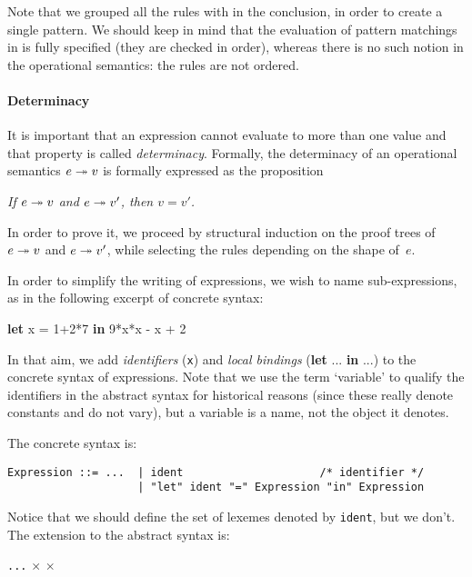 Note that we grouped all the rules with  in the conclusion,
in order to create a single pattern. We should keep in mind that the
evaluation of pattern matchings in \OCaml is fully specified (they are
checked in order), whereas there is no such notion in the operational
semantics: the rules are not ordered.

\paragraph{Determinacy}

It is important that an expression cannot evaluate to more than one
value and that property is called \emph{determinacy}. Formally, the
determinacy of an operational semantics ${e} \twoheadrightarrow {v}$ is formally
expressed as the proposition
\begin{center}
\emph{If ${e} \twoheadrightarrow {v}$ and ${e} \twoheadrightarrow {v'}$, then $v=v'$.}
\end{center}
In order to prove it, we proceed by structural induction on the proof
trees of ${e} \twoheadrightarrow {v}$ and ${e} \twoheadrightarrow {v'}$, while selecting the rules
depending on the shape of~$e$.


In order to simplify the writing of expressions, we wish to name
sub-expressions, as in the following excerpt of concrete syntax:
\begin{center}
\sf \textbf{let} x = 1+2*7 \textbf{in} 9*x*x - x + 2
\end{center}
In that aim, we add \emph{identifiers} (\verb+x+) and \emph{local
  bindings} (\textsf{\textbf{let} ... \textbf{in} ...}) to the
concrete syntax of expressions. Note that we use the term `variable'
to qualify the identifiers in the abstract syntax for historical
reasons (since these really denote constants and do not vary), but a
variable is a name, not the object it denotes.

The concrete syntax is:
\begin{verbatim}
Expression ::= ...  | ident                     /* identifier */
                    | "let" ident "=" Expression "in" Expression
\end{verbatim}
Notice that we should define the set of lexemes denoted by
\texttt{ident}, but we don't. The extension to the abstract syntax is:

\bigskip

\noindent \Xtype {} \equal \texttt{...} \vbar{} 
\Xof {} \vbar {} \Xof {} \(\times\)
 \(\times\) 

